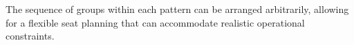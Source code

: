 
The sequence of groups within each pattern can be arranged arbitrarily, allowing for a flexible seat planning that can accommodate realistic operational constraints. 



